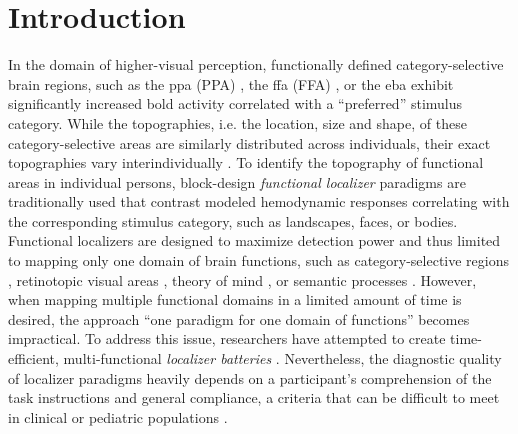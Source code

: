 
\begin{chapterabstract}


\end{chapterabstract}

\pagebreak





\section{Introduction}

In the domain of higher-visual perception, functionally defined
category-selective brain regions, such as the \acl{ppa} (PPA)
\citep{epstein1998ppa}, the \acl{ffa} (FFA) \citep{kanwisher1997ffa}, or the
\ac{eba} \citep{downing2001bodyarea} exhibit significantly increased \acf{bold}
activity correlated with a ``preferred'' \citep[][p.
123]{debeck2008interpreting} stimulus category.
%
While the topographies, i.e. the location, size and shape, of these
category-selective areas are similarly distributed across individuals, their
exact topographies vary interindividually \citep{rosenke2021probabilistic,
zhen2017quantifying, zhen2015quantifying, frost2012measuring}.
To identify the topography of functional areas in individual persons,
block-design \textit{functional localizer} paradigms are traditionally used that
contrast modeled hemodynamic responses correlating with the corresponding
stimulus category, such as landscapes, faces, or bodies.
Functional localizers are designed to maximize detection power and thus limited
to mapping only one domain of brain functions, such as category-selective
regions \citep{stigliani2015temporal}, retinotopic visual areas
\citep{wang2015probabilistic}, theory of mind \citep{spunt2014validating}, or
semantic processes \citep{fedorenko2010new, fernandez2001language}.
However, when mapping multiple functional domains in a limited amount of time is
desired, the approach ``one paradigm for one domain of functions'' becomes
impractical.
To address this issue, researchers have attempted to create time-efficient,
multi-functional \textit{localizer batteries} \citep[e.g.,][]{barch2013function,
drobyshevsky2006rapid, pinel2007fast}.
Nevertheless, the diagnostic quality of localizer paradigms heavily depends on a
participant's comprehension of the task instructions and general compliance, a
criteria that can be difficult to meet in clinical or pediatric populations
\citep{eickhoff2020towards, vanderwal2019movies}.

